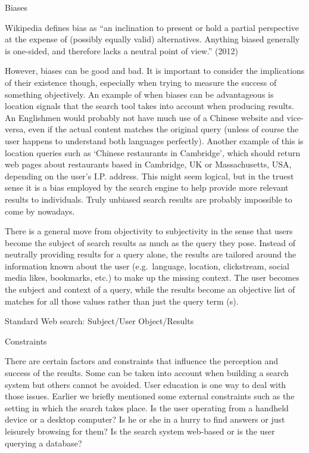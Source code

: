 Biases

\begin{leftbar}
Wikipedia defines bias as ``an inclination to present or hold a partial perspective at the expense of (possibly equally valid) alternatives. Anything biased generally is one-sided, and therefore lacks a neutral point of view.'' (2012)
\end{leftbar}

\begin{leftbar}
However, biases can be good and bad. It is important to consider the implications of their existence though, especially when trying to measure the success of something objectively. An example of when biases can be advantageous is location signals that the search tool takes into account when producing results. An Englishmen would probably not have much use of a Chinese website and vice-versa, even if the actual content matches the original query (unless of course the user happens to understand both languages perfectly). Another example of this is location queries such as `Chinese restaurants in Cambridge', which should return web pages about restaurants based in Cambridge, UK or Massachusetts, USA, depending on the user’s I.P. address.  This might seem logical, but in the truest sense it is a bias employed by the search engine to help provide more relevant results to individuals. Truly unbiased search results are probably impossible to come by nowadays.
\end{leftbar}

\begin{leftbar}
There is a general move from objectivity to subjectivity in the sense that users become the subject of search results as much as the query they pose. Instead of neutrally providing results for a query alone, the results are tailored around the information known about the user (e.g.\ language, location, clickstream, social media likes, bookmarks, etc.) to make up the missing context. The user becomes the subject and context of a query, while the results become an objective list of matches for all those values rather than just the query term (s).
\end{leftbar}

Standard Web search:  Subject/User  Object/Results

Constraints

\begin{leftbar}
There are certain factors and constraints that influence the perception and success of the results. Some can be taken into account when building a search system but others cannot be avoided. User education is one way to deal with those issues. Earlier we briefly mentioned some external constraints such as the setting in which the search takes place. Is the user operating from a handheld device or a desktop computer? Is he or she in a hurry to find answers or just leisurely browsing for them? Is the search system web-based or is the user querying a database?
\end{leftbar}

